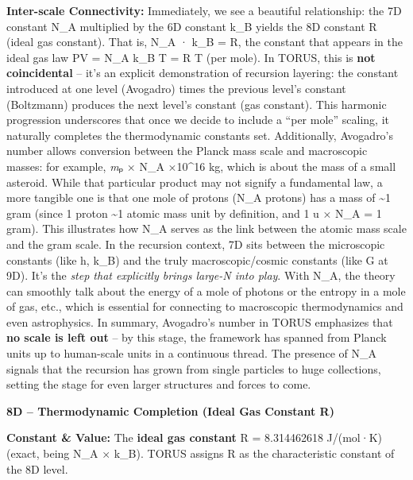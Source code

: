 \documentclass[
]{article}
\begin{document}
\textbf{Inter-scale Connectivity:} Immediately, we see a beautiful
relationship: the 7D constant N\_A multiplied by the 6D constant k\_B
yields the 8D constant R (ideal gas constant)\hspace{0pt}. That is, N\_A
· k\_B = R, the constant that appears in the ideal gas law PV = N\_A
k\_B T = R T (per mole). In TORUS, this is \textbf{not coincidental} --
it's an explicit demonstration of recursion layering: the constant
introduced at one level (Avogadro) times the previous level's constant
(Boltzmann) produces the next level's constant (gas
constant)\hspace{0pt}. This harmonic progression underscores that once
we decide to include a ``per mole'' scaling, it naturally completes the
thermodynamic constants set. Additionally, Avogadro's number allows
conversion between the Planck mass scale and macroscopic masses: for
example, \emph{m}ₚ × N\_A ×10\^{}16 kg\hspace{0pt}, which is about
the mass of a small asteroid. While that particular product may not
signify a fundamental law, a more tangible one is that one mole of
protons (N\_A protons) has a mass of \textasciitilde1 gram (since 1
proton \textasciitilde1 atomic mass unit by definition, and 1 u × N\_A =
1 gram). This illustrates how N\_A serves as the link between the atomic
mass scale and the gram scale\hspace{0pt}. In the recursion context, 7D
sits between the microscopic constants (like h, k\_B) and the truly
macroscopic/cosmic constants (like G at 9D). It's the \emph{step that
explicitly brings large-N into play}. With N\_A, the theory can smoothly
talk about the energy of a mole of photons or the entropy in a mole of
gas, etc., which is essential for connecting to macroscopic
thermodynamics and even astrophysics. In summary, Avogadro's number in
TORUS emphasizes that \textbf{no scale is left out} -- by this stage,
the framework has spanned from Planck units up to human-scale units in a
continuous thread\hspace{0pt}. The presence of N\_A signals that the
recursion has grown from single particles to huge collections, setting
the stage for even larger structures and forces to come.

\textbf{8D -- Thermodynamic Completion (Ideal Gas Constant R)}

\textbf{Constant \& Value:} The \textbf{ideal gas constant} R =
8.314462618 J/(mol·K) (exact, being N\_A × k\_B)\hspace{0pt}. TORUS
assigns R as the characteristic constant of the 8D level.
\end{document}
